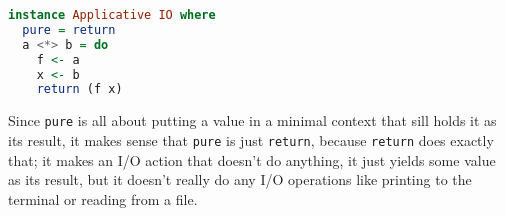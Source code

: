 \begin{lstlisting}[language=haskell]
instance Applicative IO where
  pure = return
  a <*> b = do
    f <- a
    x <- b
    return (f x)
\end{lstlisting}

Since \texttt{pure} is all about putting a value in a minimal context that sill holds it as its result, it makes sense that \texttt{pure} is just \texttt{return}, because \texttt{return} does exactly that; it makes an I/O action that doesn't do anything, it just yields some value as its result, but it doesn't really do any I/O operations like printing to the terminal or reading from a file.